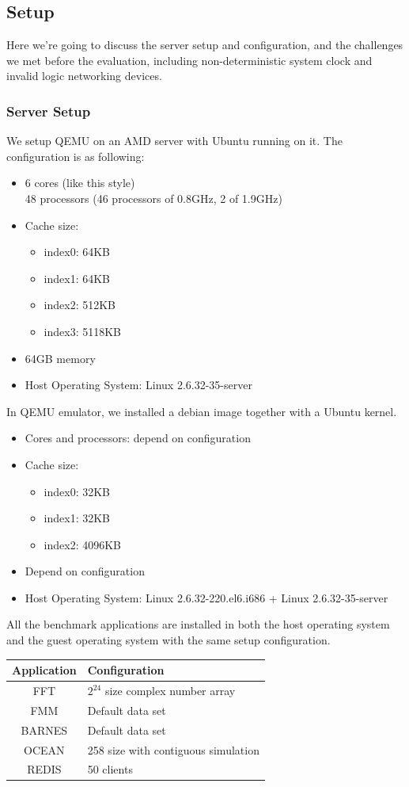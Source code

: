 \subsection{Setup}

Here we're going to discuss the server setup and configuration, and the challenges
we met before the evaluation, including non-deterministic system clock and 
invalid logic networking devices.

\subsubsection{Server Setup}

We setup QEMU on an AMD server with Ubuntu running on it. The configuration is
as following:
\begin{itemize}
\item 6 cores (like this\cite{rel:amd6core} style) \\
48 processors (46 processors of 0.8GHz, 2 of 1.9GHz)
\item Cache size:
\begin{itemize}
\item index0: 64KB
\item index1: 64KB
\item index2: 512KB
\item index3: 5118KB
\end{itemize}
\item 64GB memory
\item Host Operating System: Linux 2.6.32-35-server
\end{itemize}

In QEMU emulator, we installed a debian image together with a Ubuntu kernel. 
\begin{itemize}
\item Cores and processors: depend on configuration
\item Cache size:
\begin{itemize}
\item index0: 32KB
\item index1: 32KB
\item index2: 4096KB
\end{itemize}
\item Depend on configuration
\item Host Operating System: Linux 2.6.32-220.el6.i686 + Linux 2.6.32-35-server
\end{itemize}

All the benchmark applications are installed in both the host operating system 
and the guest operating system with the same setup configuration. 
\begin{table}[h]
\center
\begin{tabular} {c|l}
Application & Configuration \\
\hline
FFT & $2^{24}$ size complex number array \\
FMM & Default data set \\
BARNES & Default data set \\
OCEAN & 258 size with contiguous simulation \\
REDIS & 50 clients 
\end{tabular}
\end{table}

